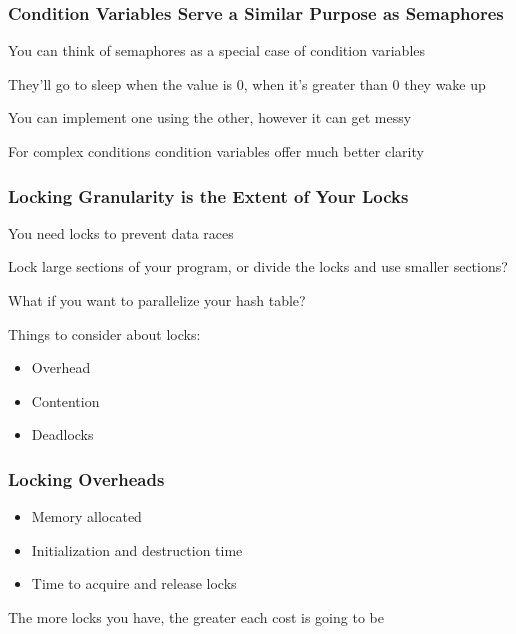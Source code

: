   \begin{frame}
    \frametitle{Condition Variables Serve a Similar Purpose as Semaphores}

    You can think of semaphores as a special case of condition variables

    \hspace{2em} They'll go to sleep when the value is 0, when it's greater
    than 0 they wake up

    \vspace{2em}

    You can implement one using the other, however it can get messy

    \vspace{2em}

    For complex conditions condition variables offer much better clarity
  \end{frame}

  \begin{frame}
    \frametitle{Locking Granularity is the Extent of Your Locks}

    You need locks to prevent data races

    \vspace{2em}

    Lock large sections of your program, or divide the locks and
    use smaller sections?

    \hspace{2em} What if you want to parallelize your hash table?

    \vspace{2em}
    
    Things to consider about locks:

    \begin{itemize}
     \item Overhead
      \item Contention
      \item Deadlocks
    \end{itemize}
  \end{frame}

  \begin{frame}
    \frametitle{Locking Overheads}

    \begin{itemize}
      \item Memory allocated
      \item Initialization and destruction time
      \item Time to acquire and release locks
    \end{itemize}

    \vspace{2em}

    The more locks you have, the greater each cost is going to be
  \end{frame}

